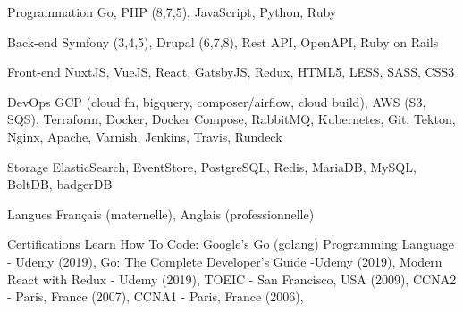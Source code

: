 

\begin{cvskills}

  \cvskill
    {Programmation} %
    {Go, PHP (8,7,5), JavaScript, Python, Ruby} %

  \cvskill
    {Back-end} %
    {Symfony (3,4,5), Drupal (6,7,8), Rest API, OpenAPI, Ruby on Rails} %

  \cvskill
    {Front-end} %
    {NuxtJS, VueJS, React, GatsbyJS, Redux, HTML5, LESS, SASS, CSS3} %

  \cvskill
    {DevOps} %
    {GCP (cloud fn, bigquery, composer/airflow, cloud build), AWS (S3, SQS), Terraform, Docker, Docker Compose, RabbitMQ, Kubernetes, Git, Tekton, Nginx, Apache, Varnish, Jenkins, Travis, Rundeck} %

  \cvskill
    {Storage} %
    {ElasticSearch, EventStore, PostgreSQL, Redis, MariaDB, MySQL, BoltDB, badgerDB} %

  \cvskill
    {Langues} %
    {Français (maternelle), Anglais (professionnelle)} %

  \cvskill
  {Certifications} %
  {
  Learn How To Code: Google’s Go (golang) Programming Language - Udemy (2019),
  Go: The Complete Developer’s Guide -Udemy (2019),
  Modern React with Redux - Udemy (2019),
  TOEIC - San Francisco, USA (2009),
  CCNA2 - Paris, France (2007),
  CCNA1 - Paris, France (2006),
  } %

\end{cvskills}
